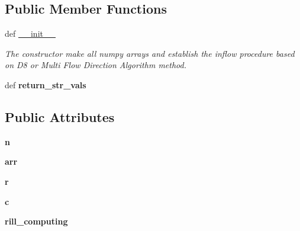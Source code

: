 \subsection*{Public Member Functions}
\begin{DoxyCompactItemize}
\item 
\hypertarget{classmain__src_8old_1_1main__classes_1_1Surface_1_1Surface_acff5e3298e3829b53f069bc35a0a8a7b}{def \hyperlink{classmain__src_8old_1_1main__classes_1_1Surface_1_1Surface_acff5e3298e3829b53f069bc35a0a8a7b}{\-\_\-\-\_\-init\-\_\-\-\_\-}}\label{classmain__src_8old_1_1main__classes_1_1Surface_1_1Surface_acff5e3298e3829b53f069bc35a0a8a7b}

\begin{DoxyCompactList}\small\item\em The constructor make all numpy arrays and establish the inflow procedure based on D8 or Multi Flow Direction Algorithm method. \end{DoxyCompactList}\item 
\hypertarget{classmain__src_8old_1_1main__classes_1_1Surface_1_1Surface_a06f25aeb8cf1513c2fafb1b24980a046}{def {\bfseries return\-\_\-str\-\_\-vals}}\label{classmain__src_8old_1_1main__classes_1_1Surface_1_1Surface_a06f25aeb8cf1513c2fafb1b24980a046}

\end{DoxyCompactItemize}
\subsection*{Public Attributes}
\begin{DoxyCompactItemize}
\item 
\hypertarget{classmain__src_8old_1_1main__classes_1_1Surface_1_1Surface_a56891c37451a7e8ed7cb7d345f098ae4}{{\bfseries n}}\label{classmain__src_8old_1_1main__classes_1_1Surface_1_1Surface_a56891c37451a7e8ed7cb7d345f098ae4}

\item 
\hypertarget{classmain__src_8old_1_1main__classes_1_1Surface_1_1Surface_aa027925649b792867af9b6af6bac9a69}{{\bfseries arr}}\label{classmain__src_8old_1_1main__classes_1_1Surface_1_1Surface_aa027925649b792867af9b6af6bac9a69}

\item 
\hypertarget{classmain__src_8old_1_1main__classes_1_1Surface_1_1Surface_a09b708e1916377acdcc8489d193de80f}{{\bfseries r}}\label{classmain__src_8old_1_1main__classes_1_1Surface_1_1Surface_a09b708e1916377acdcc8489d193de80f}

\item 
\hypertarget{classmain__src_8old_1_1main__classes_1_1Surface_1_1Surface_a887e074a5f9f419b44acb2dca37a1ac8}{{\bfseries c}}\label{classmain__src_8old_1_1main__classes_1_1Surface_1_1Surface_a887e074a5f9f419b44acb2dca37a1ac8}

\item 
\hypertarget{classmain__src_8old_1_1main__classes_1_1Surface_1_1Surface_a1f021d831f43797df036926b404728c3}{{\bfseries rill\-\_\-computing}}\label{classmain__src_8old_1_1main__classes_1_1Surface_1_1Surface_a1f021d831f43797df036926b404728c3}

\end{DoxyCompactItemize}


